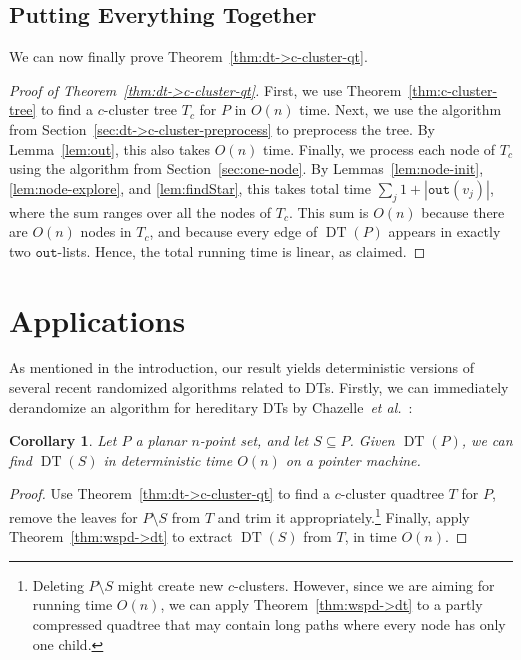 \documentclass[11pt]{paper}
\newcommand {\etal} {\textit {et al.}}
\DeclareMathOperator {\DT}{DT}
\newtheorem {cor}[theorem] {Corollary}
\begin{document}
\subsection {Putting Everything Together}
We can now finally prove Theorem~\ref{thm:dt->c-cluster-qt}.

\begin{proof}[Proof of Theorem~\ref{thm:dt->c-cluster-qt}]
First, we use Theorem~\ref{thm:c-cluster-tree} to find a $c$-cluster
tree $T_c$ for $P$ in $O(n)$ time. Next, we use the algorithm from
Section~\ref{sec:dt->c-cluster-preprocess} to preprocess the tree.
By Lemma~\ref{lem:out}, this also takes $O(n)$ time. Finally,
we process each node of $T_c$ using the algorithm from 
Section~\ref{sec:one-node}. 
By Lemmas~\ref{lem:node-init}, \ref{lem:node-explore},
and \ref{lem:findStar}, this takes total time
$\sum_{j} 1+ |\texttt{out}(v_j)|$, where the sum ranges over
all the nodes of $T_c$. This sum is $O(n)$ because there are
$O(n)$ nodes in $T_c$, and because every edge of $\DT(P)$
appears in exactly two $\texttt{out}$-lists. Hence, the total running
time is linear, as claimed.
\end{proof}





















\section {Applications}
\label {sec:applications}

  As mentioned in the introduction, 
  our result yields
  deterministic versions of several recent randomized algorithms
  related to DTs. 
  Firstly, we can immediately derandomize
  an algorithm for hereditary DTs by
  Chazelle~\etal~\cite{ChazelleDeHuMoSaTe02,ChazelleMu11}:


  \begin {cor}\label{cor:split}
     Let $P$ a planar $n$-point set, and let $S \subseteq P$.
     Given $\DT(P)$, we can find $\DT(S)$
     in deterministic time $O(n)$ on a pointer machine.
  \end {cor}

  \begin{proof}
     Use Theorem~\ref{thm:dt->c-cluster-qt}  to find a $c$-cluster
     quadtree $T$ for $P$,
     remove the leaves for $P \setminus S$ from $T$ and trim it
     appropriately.\footnote{Deleting $P \setminus S$ might
     create new $c$-clusters. However, since we are aiming
     for running time $O(n)$, we can  apply Theorem~\ref{thm:wspd->dt}
     to a partly compressed quadtree that may contain
     long paths where every node has only one child.}
     Finally, apply Theorem~\ref{thm:wspd->dt} to extract $\DT(S)$ from $T$,
     in time $O(n)$.
  \end{proof}
\end{document}
